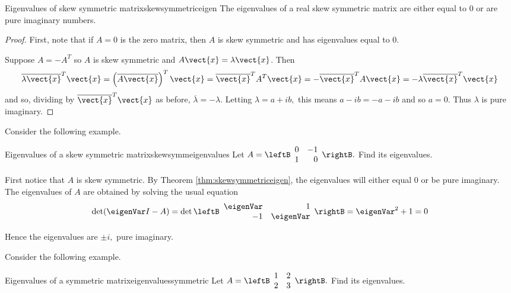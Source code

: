 \begin{theorem}{Eigenvalues of skew symmetric matrix}{skewsymmetriceigen}
The eigenvalues of a real skew symmetric matrix are either equal to $0$ or are pure imaginary numbers.
\end{theorem}

\begin{proof}
First, note that if $A=0$ is the zero matrix, then $A$ is skew symmetric and has eigenvalues equal to $0$. 

Suppose $A=-A^{T}$ so $A$ is skew symmetric and $A\vect{x}=\lambda 
\vect{x}$. Then 
\begin{equation*}
\overline{\lambda \vect{x}}^{T}\vect{x}=\left( \overline{A
\vect{x}}\right) ^{T}\vect{x}=\overline{\vect{x}}^{T}A^{T}\vect{x}=-
\overline{\vect{x}}^{T}A\vect{x}=-\lambda \overline{\vect{x}}^{T}
\vect{x}
\end{equation*}
and so, dividing by $\overline{\vect{x}}^{T}\vect{x}$ as before, $
\overline{\lambda }=-\lambda .$ Letting $\lambda =a+ib,$ this means $
a-ib=-a-ib$ and so $a=0.$ Thus $\lambda $ is pure imaginary. 
\end{proof}

Consider the following example. 

\begin{example}{Eigenvalues of a skew symmetric matrix}{skewsymmeigenvalues}
Let $A=\leftB
\begin{array}{rr}
0 & -1 \\
1 & 0
\end{array}
\rightB .$  Find its eigenvalues.
\end{example}

\begin{solution}
First notice that $A$ is skew symmetric. By Theorem \ref{thm:skewsymmetriceigen}, the eigenvalues will either equal $0$ or be pure imaginary.  The eigenvalues of $A$ are obtained by solving the usual equation 
\[
\det (\eigenVar I - A ) = 
\det \leftB
\begin{array}{rr}
\eigenVar & 1 \\ 
-1 & \eigenVar
\end{array}
\rightB =\eigenVar ^{2}+1=0
\]

Hence the eigenvalues are $\pm i,$ pure
imaginary.
\end{solution}

Consider the following example.

\begin{example}{Eigenvalues of a symmetric matrix}{eigenvaluessymmetric}
Let $A=\leftB
\begin{array}{rr}
1 & 2 \\
2 & 3
\end{array}
\rightB .$ Find its eigenvalues.
\end{example}

